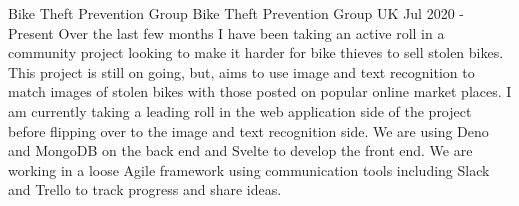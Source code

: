 \begin{cventries}
    \cventry
        {Bike Theft Prevention Group}
        {Bike Theft Prevention Group}
        {UK}
        {Jul 2020 - Present}
        {
            Over the last few months I have been taking an active roll in a community project looking to make it harder for bike thieves to sell stolen bikes. This project is still on going, but, aims to use image and text recognition to match images of stolen bikes with those posted on popular online market places. I am currently taking a leading roll in the web application side of the project before flipping over to the image and text recognition side. We are using Deno and MongoDB on the back end and Svelte to develop the front end. We are working in a loose Agile framework using communication tools including Slack and Trello to track progress and share ideas. 
        }

\end{cventries}





